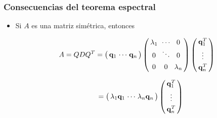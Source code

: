 {\nologo 
\begin{frame}\frametitle{Consecuencias del teorema espectral}
	
	\begin{itemize}
		\item Si $A$ es una matriz simétrica, entonces			
		
		\[
		A = QDQ^T 
		=
		\left(
		\begin{array}{@{\hspace{0.3\tabcolsep}}c@{\hspace{0.5\tabcolsep}}c@{\hspace{0.5\tabcolsep}}c@{\hspace{0.3\tabcolsep}}}
		\mathbf{q}_1 & \cdots & \mathbf{q}_n
		\end{array}
		\right)
		\left(
		\begin{array}{@{\hspace{0.3\tabcolsep}}c@{\hspace{\tabcolsep}}c@{\hspace{\tabcolsep}}c@{\hspace{0.3\tabcolsep}}}
		\lambda_1 & \cdots & 0 \\[0mm]
		        0 & \ddots & 0 \\[1.5mm]
				0 & 0 & \lambda_n
		\end{array}
		\right)
		\left(
		\begin{array}{@{\hspace{0.3\tabcolsep}}c@{\hspace{0.3\tabcolsep}}}
		\mathbf{q}_1^T \\[1mm]
		\vdots  \\[1mm]
		\mathbf{q}_n^T
		\end{array}
		\right)
		\]	
		
		\vspace{2mm}
		\[
		\phantom{A = QDQ^T} 
		=		
		\left(
		\begin{array}{@{\hspace{0.3\tabcolsep}}c@{\hspace{0.5\tabcolsep}}c@{\hspace{0.5\tabcolsep}}c@{\hspace{0.3\tabcolsep}}}
		\lambda_1\mathbf{q}_1 & \cdots & \lambda_n\mathbf{q}_n
		\end{array}
		\right)		
		\left(
		\begin{array}{@{\hspace{0.3\tabcolsep}}c@{\hspace{0.3\tabcolsep}}}
		\mathbf{q}_1^T \\[1mm]
		\vdots  \\[1mm]
		\mathbf{q}_n^T
		\end{array}
		\right) \hspace{1.5cm}
		\]	
		

\end{itemize}
\end{frame}}
